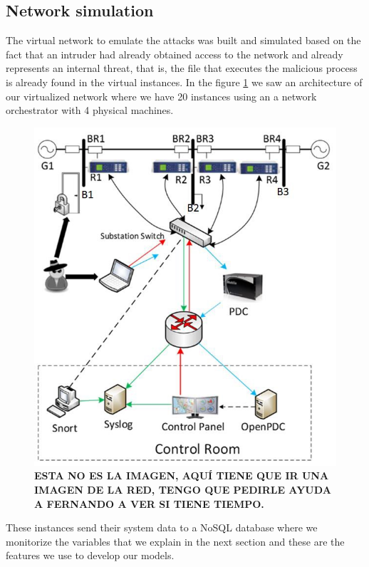 \documentclass{iosart2c}
\begin{document}
\subsection{Network simulation}

The virtual network to emulate the attacks was built and simulated based on the fact that an intruder had already obtained access to the network and already represents an internal threat, that is, the file that executes the malicious process is already found in the virtual instances. In the figure \ref{fig:virtual_network} we saw an architecture of our virtualized network where we have 20 instances using an a network orchestrator with 4 physical machines.\\


\begin{figure}[h!]
\centering
\includegraphics[scale=0.56]{figs/network/diagrama_ejemplo.jpg}
\caption{\textbf{ESTA NO ES LA IMAGEN, AQUÍ TIENE QUE IR UNA IMAGEN DE LA RED, TENGO QUE PEDIRLE AYUDA A FERNANDO A VER SI TIENE TIEMPO.}}
\label{fig:virtual_network}
\end{figure}

These instances send their system data to a NoSQL database where we monitorize the variables that we explain in the next section and these are the features we use to develop our models.
\end{document}
